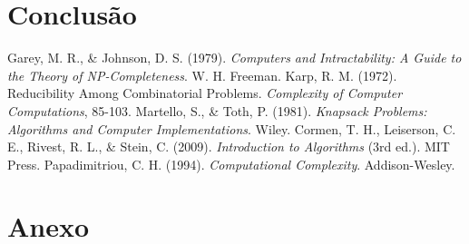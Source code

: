 \documentclass{article}
\begin{document}
\section{Conclusão}




\begin{thebibliography}{99}
 Garey, M. R., \& Johnson, D. S. (1979). \textit{Computers and Intractability: A Guide to the Theory of NP-Completeness}. W. H. Freeman.
 Karp, R. M. (1972). Reducibility Among Combinatorial Problems. \textit{Complexity of Computer Computations}, 85-103.
 Martello, S., \& Toth, P. (1981). \textit{Knapsack Problems: Algorithms and Computer Implementations}. Wiley.
 Cormen, T. H., Leiserson, C. E., Rivest, R. L., \& Stein, C. (2009). \textit{Introduction to Algorithms} (3rd ed.). MIT Press.
 Papadimitriou, C. H. (1994). \textit{Computational Complexity}. Addison-Wesley.
\end{thebibliography}

\section{Anexo}
\end{document}
